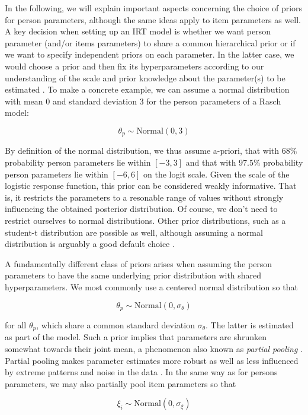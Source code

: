 \documentclass[jss]{jss}
\begin{document}
In the following, we will explain important aspects concerning the
choice of priors for person parameters, although the same ideas apply to
item parameters as well. A key decision when setting up an IRT model is
whether we want person parameter (and/or items parameters) to share a
common hierarchical prior or if we want to specify independent priors on
each parameter. In the latter case, we would choose a prior and then fix
its hyperparameters according to our understanding of the scale and
prior knowledge about the parameter(s) to be estimated
\citep{gelman2013}. To make a concrete example, we can assume a normal
distribution with mean \(0\) and standard deviation \(3\) for the person
parameters of a Rasch model:

\[
\theta_p \sim \text{Normal}(0, 3)
\]

By definition of the normal distribution, we thus assume a-priori, that
with \(68\%\) probability person parameters lie within \([-3, 3]\) and
that with \(97.5\%\) probability person parameters lie within
\([-6, 6]\) on the logit scale. Given the scale of the logistic response
function, this prior can be considered weakly informative. That is, it
restricts the parameters to a resonable range of values without strongly
influencing the obtained posterior distribution. Of course, we don't
need to restrict ourselves to normal distributions. Other prior
distributions, such as a student-t distribution are possible as well,
although assuming a normal distribution is arguably a good default
choice \citep[see also][]{mcelreath2017}.

A fundamentally different class of priors arises when assuming the
person parameters to have the same underlying prior distribution with
shared hyperparameters. We most commonly use a centered normal
distribution so that

\[
\theta_p \sim \text{Normal}(0, \sigma_\theta)
\]

for all \(\theta_p\), which share a common standard deviation
\(\sigma_\theta\). The latter is estimated as part of the model. Such a
prior implies that parameters are shrunken somewhat towards their joint
mean, a phenomenon also known as \emph{partial pooling}
\citep{gelmanMLM2006}. Partial pooling makes parameter estimates more
robust as well as less influenced by extreme patterns and noise in the
data \citep{gelmanMLM2006}. In the same way as for persons parameters,
we may also partially pool item parameters so that

\[
\xi_i \sim \text{Normal}(0, \sigma_\xi)
\]
\end{document}
